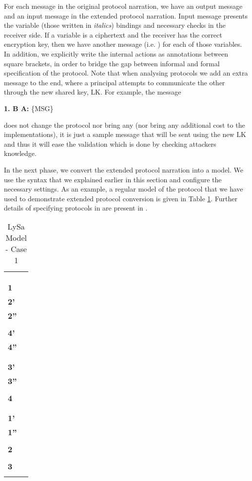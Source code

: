 For each message in the original protocol narration, we have an output message  and an input message  in the extended protocol narration.
Input message  presents the variable (those written in \emph{italics}) bindings and necessary checks in the receiver side.
If a variable is a ciphertext and the receiver has the correct encryption key, then we have another message (i.e. ) for each of those variables.
In addition, we explicitly write the internal actions as annotations between square brackets, in order to bridge the gap between informal and formal specification of the protocol.
Note that when analysing protocols we add an extra message to the end, where a principal attempts to communicate the other through the new shared key, LK. For example, the message
\begin{center} \textbf{1. B  A:} \{MSG\} \end{center}
does not change the protocol nor bring any (nor bring any additional cost to the implementations), it is just a sample message that will be sent using the new LK and 
thus it will ease the validation which is done by checking attackers knowledge.

In the next phase, we convert the extended protocol narration into a \LYSA model. 
We use the \LYSA syntax that we explained earlier in this section and configure the necessary settings.
As an example, a regular \LYSA model of the protocol that we have used
to demonstrate extended protocol conversion is given in Table \ref{tab:lysaC1}.
Further details of specifying protocols in \LYSA are present in \cite{bod:1}.

\begin{table}\caption{LySa Model - Case 1}
\label{tab:lysaC1}
\centering
\begin{tabular}{l@{}l}
\hline
             & \\
             &  \\


& \\
\textbf{1}   & \\
\textbf{2'}  & \\
\textbf{2''} & \\
              & \\
\textbf{4'}  & \\
\textbf{4'' } &  \\
              & \\
& \\
\textbf{3'}  & \\
\textbf{3''} & \\
              & \\
\textbf{4}   &  \\
              & \\
& \\
\textbf{1'}  & \\
\textbf{1''} & \\
              & \\
\textbf{2}   & \\
              & \\
\textbf{3}   & \\
              &  \\
\hline
\end{tabular}
\end{table}

